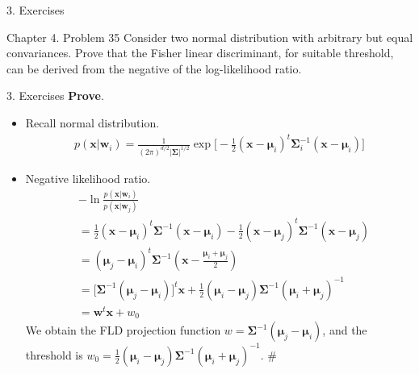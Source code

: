 \documentclass[compress,blue]{beamer}
\newcommand{\bx}{\mathbf{x}}
\begin{document}
\begin{frame}{3. Exercises}
	\begin{block}{Chapter 4. Problem 35}
		Consider two normal distribution with arbitrary but equal convariances. Prove that the Fisher linear discriminant, for suitable threshold, can be derived from the negative of the log-likelihood ratio. 
	\end{block}
\end{frame}

\begin{frame}{3. Exercises}
	\textbf{Prove}. 
	\begin{itemize}
		\item Recall normal distribution. 
		\begin{align}
			p(\mathbf{x}|\mathbf{w}_i) = \frac{1}{(2\pi)^{d/2}|\mathbf{\Sigma}|^{1/2}} \exp\Big[-\frac{1}{2}(\mathbf{x}-\mathbf{\mu}_i)^t\mathbf{\Sigma}_i^{-1}(\mathbf{x}-\mathbf{\mu}_i)\Big] \nonumber
		\end{align}
		\item Negative likelihood ratio.
		\scriptsize
		\begin{align}
			&-\ln \frac{p(\mathbf{x}|\mathbf{w}_i)}{p(\mathbf{x}|\mathbf{w}_j)} \nonumber\\
			&= \frac{1}{2}(\mathbf{x}-\mathbf{\mu}_i)^t\mathbf{\Sigma}^{-1}(\mathbf{x}-\mathbf{\mu}_i) - \frac{1}{2}(\mathbf{x}-\mathbf{\mu}_j)^t\mathbf{\Sigma}^{-1}(\mathbf{x}-\mathbf{\mu}_j)  \nonumber\\
			&= (\mathbf{\mu}_j - \mathbf{\mu}_i)^t\mathbf{\Sigma}^{-1}(\bx - \frac{\mathbf{\mu}_i+\mathbf{\mu}_j}{2})\\
			&= \big[\mathbf{\Sigma}^{-1}(\mathbf{\mu}_j - \mathbf{\mu}_i)\big]^t \bx + \frac{1}{2}(\mathbf{\mu}_i - \mathbf{\mu}_j)\mathbf{\Sigma}^{-1}(\mathbf{\mu}_i + \mathbf{\mu}_j)^{-1}\\
			&=\mathbf{w}^t\bx + w_0 
		\end{align}
		We obtain the FLD projection function $w = \mathbf{\Sigma}^{-1}(\mathbf{\mu}_j - \mathbf{\mu}_i)$, and the threshold is $w_0 = \frac{1}{2}(\mathbf{\mu}_i - \mathbf{\mu}_j)\mathbf{\Sigma}^{-1}(\mathbf{\mu}_i + \mathbf{\mu}_j)^{-1}$. \#
		\normalsize
	\end{itemize}
\end{frame}
\end{document}

